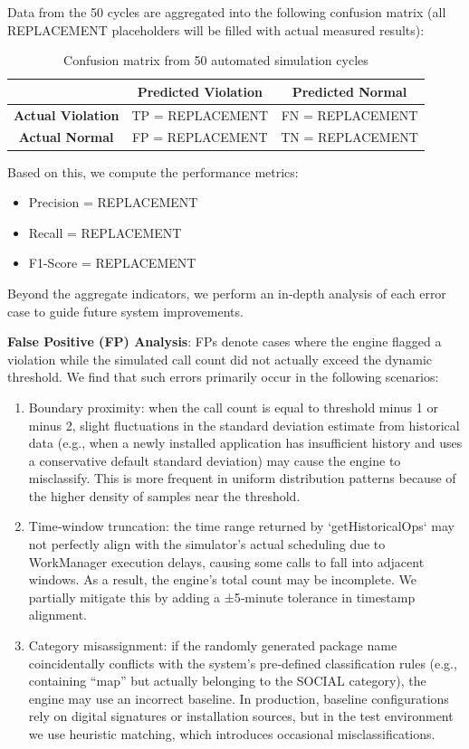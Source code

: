 Data from the 50 cycles are aggregated into the following confusion matrix (all REPLACEMENT placeholders will be filled with actual measured results):

\begin{table}[H]
\centering
\caption{Confusion matrix from 50 automated simulation cycles}
\begin{tabular}{c|c|c}
\toprule
 & \textbf{Predicted Violation} & \textbf{Predicted Normal} \\
\midrule
\textbf{Actual Violation} & TP = REPLACEMENT & FN = REPLACEMENT \\
\textbf{Actual Normal} & FP = REPLACEMENT & TN = REPLACEMENT \\
\bottomrule
\end{tabular}
\end{table}

Based on this, we compute the performance metrics:
\begin{itemize}
\item Precision = REPLACEMENT
\item Recall = REPLACEMENT
\item F1-Score = REPLACEMENT
\end{itemize}

Beyond the aggregate indicators, we perform an in‑depth analysis of each error case to guide future system improvements.

\textbf{False Positive (FP) Analysis}: FPs denote cases where the engine flagged a violation while the simulated call count did not actually exceed the dynamic threshold. We find that such errors primarily occur in the following scenarios:
\begin{enumerate}
    \item Boundary proximity: when the call count is equal to threshold minus 1 or minus 2, slight fluctuations in the standard deviation estimate from historical data (e.g., when a newly installed application has insufficient history and uses a conservative default standard deviation) may cause the engine to misclassify. This is more frequent in uniform distribution patterns because of the higher density of samples near the threshold.
    \item Time‑window truncation: the time range returned by `getHistoricalOps` may not perfectly align with the simulator's actual scheduling due to WorkManager execution delays, causing some calls to fall into adjacent windows. As a result, the engine's total count may be incomplete. We partially mitigate this by adding a ±5‑minute tolerance in timestamp alignment.
    \item Category misassignment: if the randomly generated package name coincidentally conflicts with the system's pre‑defined classification rules (e.g., containing “map” but actually belonging to the SOCIAL category), the engine may use an incorrect baseline. In production, baseline configurations rely on digital signatures or installation sources, but in the test environment we use heuristic matching, which introduces occasional misclassifications.
\end{enumerate}

